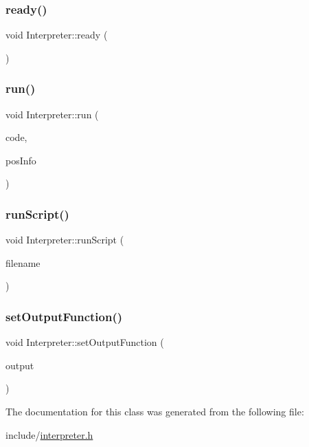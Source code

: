 \subsubsection{\texorpdfstring{ready()}{ready()}}
{\footnotesize\ttfamily void Interpreter\+::ready (\begin{DoxyParamCaption}{ }\end{DoxyParamCaption})}

\mbox{\label{classInterpreter_acd0f2550080bcf9c769da5e9b056d005}} 
\subsubsection{\texorpdfstring{run()}{run()}}
{\footnotesize\ttfamily void Interpreter\+::run (\begin{DoxyParamCaption}\item[{const char $\ast$}]{code,  }\item[{\hyperlink{classPosInfo}{Pos\+Info}}]{pos\+Info }\end{DoxyParamCaption})}

\mbox{\label{classInterpreter_a98b6ecfea24f94e180bd1853a39f0a12}} 
\subsubsection{\texorpdfstring{run\+Script()}{runScript()}}
{\footnotesize\ttfamily void Interpreter\+::run\+Script (\begin{DoxyParamCaption}\item[{const char $\ast$}]{filename }\end{DoxyParamCaption})}

\mbox{\label{classInterpreter_a3578606fb7dfe1705aee148a468a39a6}} 
\subsubsection{\texorpdfstring{set\+Output\+Function()}{setOutputFunction()}}
{\footnotesize\ttfamily void Interpreter\+::set\+Output\+Function (\begin{DoxyParamCaption}\item[{\hyperlink{interpreter_8h_a57e80eaa218fd4f66b1d55c833119967}{O\+U\+T\+P\+U\+T\+\_\+\+F\+U\+N\+C\+T\+I\+ON}}]{output }\end{DoxyParamCaption})}



The documentation for this class was generated from the following file\+:\begin{DoxyCompactItemize}
\item 
include/\hyperlink{interpreter_8h}{interpreter.\+h}\end{DoxyCompactItemize}

